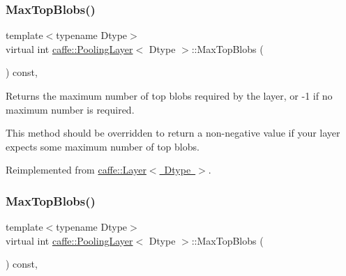 \mbox{\label{classcaffe_1_1_pooling_layer_a76539d04ef7252c12e932ea703f8246b}} 
\subsubsection{\texorpdfstring{Max\+Top\+Blobs()}{MaxTopBlobs()}\hspace{0.1cm}{\footnotesize\ttfamily [1/2]}}
{\footnotesize\ttfamily template$<$typename Dtype$>$ \\
virtual int \mbox{\hyperlink{classcaffe_1_1_pooling_layer}{caffe\+::\+Pooling\+Layer}}$<$ Dtype $>$\+::Max\+Top\+Blobs (\begin{DoxyParamCaption}{ }\end{DoxyParamCaption}) const\hspace{0.3cm}{\ttfamily [inline]}, {\ttfamily [virtual]}}



Returns the maximum number of top blobs required by the layer, or -\/1 if no maximum number is required. 

This method should be overridden to return a non-\/negative value if your layer expects some maximum number of top blobs. 

Reimplemented from \mbox{\hyperlink{classcaffe_1_1_layer_ac6c03df0b6e40e776c94001e19994a2e}{caffe\+::\+Layer$<$ Dtype $>$}}.

\mbox{\label{classcaffe_1_1_pooling_layer_a76539d04ef7252c12e932ea703f8246b}} 
\subsubsection{\texorpdfstring{Max\+Top\+Blobs()}{MaxTopBlobs()}\hspace{0.1cm}{\footnotesize\ttfamily [2/2]}}
{\footnotesize\ttfamily template$<$typename Dtype$>$ \\
virtual int \mbox{\hyperlink{classcaffe_1_1_pooling_layer}{caffe\+::\+Pooling\+Layer}}$<$ Dtype $>$\+::Max\+Top\+Blobs (\begin{DoxyParamCaption}{ }\end{DoxyParamCaption}) const\hspace{0.3cm}{\ttfamily [inline]}, {\ttfamily [virtual]}}




